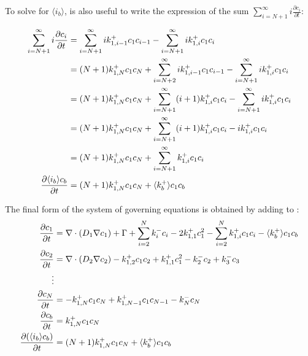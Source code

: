 To solve for $\langle i_b \rangle$, is also useful to write the expression of the sum $\sum\limits_{i=N+1}^\infty i \frac{\partial c_i}{\partial t}$:

\begin{align}
    \sum\limits_{i=N+1}^\infty i \frac{\partial c_i}{\partial t} &= \sum\limits_{i=N+1}^\infty i k_{1,i-1}^+ c_1 c_{i-1} - \sum\limits_{i=N+1}^\infty i k_{1,i}^+ c_1 c_{i} \nonumber\\
    &= (N+1) k_{1,N}^+ c_1 c_N + \sum\limits_{i=N+2}^\infty i k_{1,i-1}^+ c_1 c_{i-1} - \sum\limits_{i=N+1}^\infty i k_{1,i}^+ c_1 c_{i} \nonumber\\
    &= (N+1) k_{1,N}^+ c_1 c_N + \sum\limits_{i=N+1}^\infty (i + 1) k_{1,i}^+ c_1 c_{i} - \sum\limits_{i=N+1}^\infty i k_{1,i}^+ c_1 c_{i} \nonumber\\
    &= (N+1) k_{1,N}^+ c_1 c_N + \sum\limits_{i=N+1}^\infty (i + 1) k_{1,i}^+ c_1 c_{i} - i k_{1,i}^+ c_1 c_{i} \nonumber\\
    &= (N+1) k_{1,N}^+ c_1 c_N + \sum\limits_{i=N+1}^\infty k_{1,i}^+ c_1 c_{i} \nonumber\\
    \frac{\partial \langle i_b \rangle c_b}{\partial t} &= (N+1) k_{1,N}^+ c_1 c_N + \langle k_b^+ \rangle c_1 c_b
    \labeq{pde for d (cb ib)/ dt}
\end{align}

The final form of the system of governing equations is obtained by adding  to :
\begin{subequations}
    \begin{align}
        \frac{\partial c_1}{\partial t} &= \nabla \cdot (D_1 \nabla c_1) + \Gamma + \sum\limits_{i=2}^N k_{i}^- c_i- 2k_{1, 1}^+ c_1^2 - \sum\limits_{i=2}^N k_{1,i}^+ c_1 c_i - \langle k_b^+ \rangle c_1 c_b \labeq{final system of equation: c1}\\
        \frac{\partial c_2}{\partial t} &= \nabla \cdot (D_2 \nabla c_2) - k_{1, 2}^+ c_1 c_2 + k_{1, 1}^+ c_1^2 - k_{2}^- c_2 + k_{3}^- c_3\\
        \vdots \nonumber\\
        \frac{\partial c_N}{\partial t} &= - k_{1, N}^+ c_1 c_N + k_{1, N-1}^+ c_1 c_{N-1} - k_{N}^- c_N\\
        \frac{\partial c_b}{\partial t} &= k_ {1,N}^+ c_1 c_N \\
        \frac{\partial (\langle i_b \rangle c_b)}{\partial t} &= (N+1)k_ {1,N}^+ c_1 c_N  + \langle k_b^+ \rangle c_1 c_b \labeq{final system of equation: ib cb}
    \end{align}
    \labeq{final system of equation}
\end{subequations}

